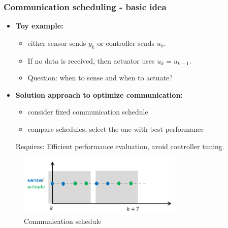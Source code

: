 \documentclass{beamer}
\begin{document}
\begin{frame}
\frametitle{Communication scheduling - basic idea} 

\begin{itemize}\item \textbf{Toy example:}
\begin{itemize}
 \item   either sensor sends $y_k$ or controller sends $u_k$. 
  \item[] If no data is received, then actuator uses $u_k = u_{k-1}$.
	\item Question: when to sense and when to actuate? %
 \end{itemize}

	\item \textbf{
  Solution approach to optimize communication:}
	\begin{itemize}
\item consider fixed communication schedule  
\item compare  schedules, select the one with best  performance
\end{itemize}	
	Requires: Efficient performance evaluation, avoid controller tuning.
\end{itemize}

\begin{figure}
\centering
\vspace*{-.2in}
\includegraphics[width=0.7\textwidth ]{timing2.png}\\
  {{\footnotesize Communication schedule}} 
\end{figure} 
\end{frame}
\end{document}
